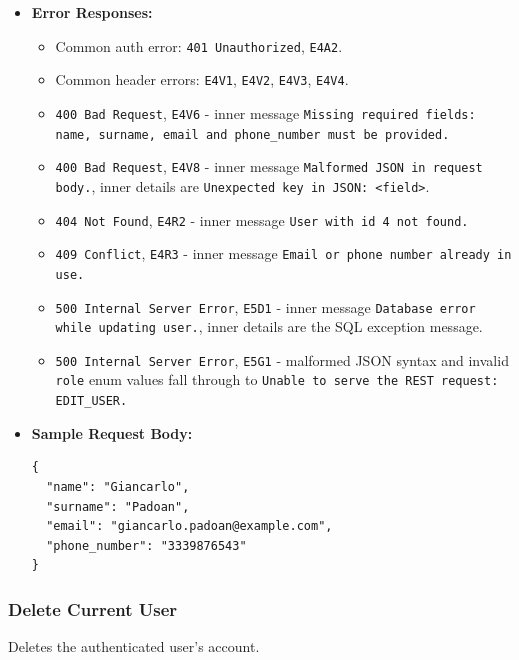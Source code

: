\begin{itemize}[nosep]
\item \textbf{Error Responses:}

\begin{itemize}[nosep]
\item Common auth error: \texttt{401 Unauthorized}, \texttt{E4A2}.
\item Common header errors: \texttt{E4V1}, \texttt{E4V2}, \texttt{E4V3}, \texttt{E4V4}.
\item \texttt{400 Bad Request}, \texttt{E4V6} - inner message \texttt{Missing required fields: name, surname, email and phone\_number must be provided.}
\item \texttt{400 Bad Request}, \texttt{E4V8} - inner message \texttt{Malformed JSON in request body.}, inner details are \texttt{Unexpected key in JSON: <field>}.
\item \texttt{404 Not Found}, \texttt{E4R2} - inner message \texttt{User with id 4 not found.}
\item \texttt{409 Conflict}, \texttt{E4R3} - inner message \texttt{Email or phone number already in use.}
\item \texttt{500 Internal Server Error}, \texttt{E5D1} - inner message \texttt{Database error while updating user.}, inner details are the SQL exception message.
\item \texttt{500 Internal Server Error}, \texttt{E5G1} - malformed JSON syntax and invalid \texttt{role} enum values fall through to \texttt{Unable to serve the REST request: EDIT\_USER.}
\end{itemize}

\item \textbf{Sample Request Body:}

\begin{lstlisting}
{
  "name": "Giancarlo",
  "surname": "Padoan",
  "email": "giancarlo.padoan@example.com",
  "phone_number": "3339876543"
}
\end{lstlisting}
\end{itemize}

\subsubsection*{Delete Current User}

Deletes the authenticated user's account.


